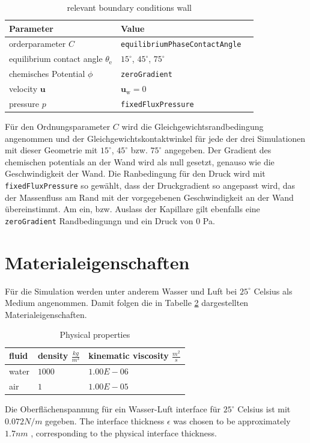 \begin{table}[h]
    \centering
        \caption{relevant boundary conditions wall}
        \label{tab: BoundaryConditions_wall}
        \begin{tabular}{lll}
            Parameter & Value \\ \hline
            orderparameter $C$ & \texttt{equilibriumPhaseContactAngle}     \\
            equilibrium contact angle $\theta_{\mathrm{e}}$ & $15^{\circ}$, $45^{\circ}$, $75^{\circ}$\\
            chemisches Potential $\phi$   & \texttt{zeroGradient}        \\ 
            velocity $\mathbf{u}$ &   $\mathbf{u_{\mathrm{w}}} = 0$\\
            pressure $p$&  \texttt{fixedFluxPressure} \\
        \end{tabular}
\end{table}
Für den Ordnungsparameter $C$ wird die Gleichgewichtsrandbedingung angenommen und der Gleichgewichtskontaktwinkel für jede der drei Simulationen mit dieser Geometrie mit $15^{\circ}$, $45^{\circ}$ bzw. $75^{\circ}$ angegeben. Der Gradient des chemischen potentials an der Wand wird als null gesetzt, genauso wie die Geschwindigkeit der Wand. Die Ranbedingung für den Druck wird mit \texttt{fixedFluxPressure} so gewählt, dass der Druckgradient so angepasst wird, das der Massenfluss am Rand mit der vorgegebenen Geschwindigkeit an der Wand übereinstimmt. 
Am ein, bzw. Auslass der Kapillare gilt ebenfalls eine \texttt{zeroGradient} Randbedingungn und ein Druck von $0$ Pa.

\section{Materialeigenschaften}
Für die Simulation werden unter anderem Wasser und Luft bei $25^{\circ}$ Celsius als Medium angenommen. Damit folgen die in Tabelle \ref{tab:physicalProperties_CaseSetup} dargestellten Materialeigenschaften. 
\begin{table}[h]
    \centering
    \caption{Physical properties}
    \label{tab:physicalProperties_CaseSetup}
    \begin{tabular}{lll}
    fluid & density $\frac{kg}{m^3}$ & kinematic viscosity $\frac{m^2}{s}$ \\ \hline
    water & $1000$                     & $1.00E-06$                          \\
    air   & $1$                        & $1.00E-05$                          \\ 
    \end{tabular}
    \end{table}
Die Oberflächenspannung für ein Wasser-Luft interface für $25^{\circ}$ Celsius ist mit \(0.072 N/m\) gegeben. The interface thickness \( \epsilon \) was chosen to be approximately \(1.7 nm\) \cite{bagheriInterfacialRelaxationCrucial2022}, corresponding to the physical interface thickness.

